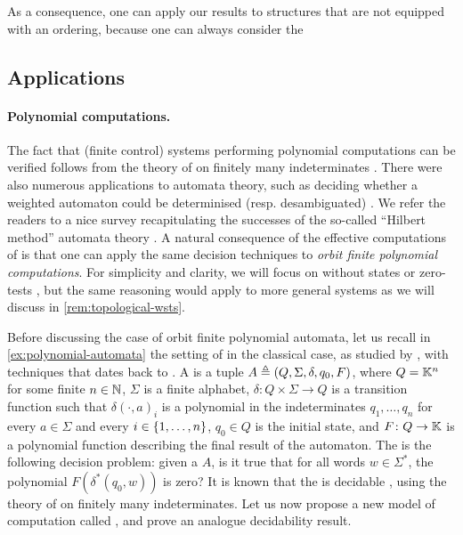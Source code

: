 \AP 
As a consequence, one can apply our results to structures that are not equipped 
with an ordering, because one can always consider the 




\subsection{Applications}


\paragraph{Polynomial computations.} \AP The fact that (finite control) systems
performing polynomial computations can be verified follows from the theory of
 on finitely many indeterminates \cite{MULSEI02,BEDUSHWO17}.
There were also numerous applications to automata theory, such as deciding
whether a weighted automaton could be determinised (resp. desambiguated)
\cite{BESM23,PUSM24}. We refer the readers to a nice survey recapitulating the
successes of the so-called ``Hilbert method'' automata theory \cite{BOJAN19}. A
natural consequence of the effective computations of  is that one can apply the same decision techniques to \emph{orbit finite
polynomial computations}. For simplicity and clarity, we will focus on
 without states or zero-tests \cite{BEDUSHWO17}, but
the same reasoning would apply to more general systems as we will discuss in
\cref{rem:topological-wsts}.


\AP Before discussing the case of orbit finite polynomial automata, let us
recall in \cref{ex:polynomial-automata} the setting of 
in the classical case, as studied by \cite{BEDUSHWO17}, with techniques that
dates back to \cite{MULSEI02}. A  is a tuple $A
\triangleq (Q, \Sigma, \delta, q_0, F)$, where $Q = \mathbb{K}^n$ for some finite $n \in
\mathbb{N}$, $\Sigma$ is a finite alphabet, $\delta \colon Q \times \Sigma \to Q$ is a
transition function such that $\delta(\cdot,a)_i$ is a polynomial in the
indeterminates $q_1, \dots, q_n$ for every $a \in \Sigma$ and every $i \in
\{ 1, \dots, n \}$, $q_0 \in Q$ is the initial state, and $F \colon Q \to \mathbb{K}$
is a polynomial function describing the final result of the automaton. The
 is the following decision
problem: given a  $A$, is it true that for all words
$w \in \Sigma^*$, the polynomial $F(\delta^*(q_0, w))$ is zero? It is known
that the  is decidable
\cite{BEDUSHWO17}, using the theory of  on finitely many
indeterminates. Let us now propose a new model of computation called , and prove an analogue decidability result.

